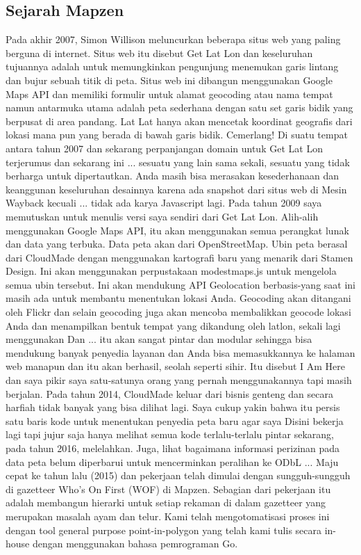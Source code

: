 \subsection{Sejarah Mapzen}
Pada akhir 2007, Simon Willison meluncurkan beberapa situs web yang paling berguna di internet. Situs web itu disebut Get Lat Lon dan keseluruhan tujuannya adalah untuk memungkinkan pengunjung menemukan garis lintang dan bujur sebuah titik di peta.
Situs web ini dibangun menggunakan Google Maps API dan memiliki formulir untuk alamat geocoding atau nama tempat namun antarmuka utama adalah peta sederhana dengan satu set garis bidik yang berpusat di area pandang. Lat Lat hanya akan mencetak koordinat geografis dari lokasi mana pun yang berada di bawah garis bidik. Cemerlang!
Di suatu tempat antara tahun 2007 dan sekarang perpanjangan domain untuk Get Lat Lon terjerumus dan sekarang ini ... sesuatu yang lain sama sekali, sesuatu yang tidak berharga untuk dipertautkan. Anda masih bisa merasakan kesederhanaan dan keanggunan keseluruhan desainnya karena ada snapshot dari situs web di Mesin Wayback kecuali ... tidak ada karya Javascript lagi.
Pada tahun 2009 saya memutuskan untuk menulis versi saya sendiri dari Get Lat Lon. Alih-alih menggunakan Google Maps API, itu akan menggunakan semua perangkat lunak dan data yang terbuka. Data peta akan dari OpenStreetMap. Ubin peta berasal dari CloudMade dengan menggunakan kartografi baru yang menarik dari Stamen Design. Ini akan menggunakan perpustakaan modestmaps.js untuk mengelola semua ubin tersebut. Ini akan mendukung API Geolocation berbasis-yang saat ini masih ada untuk membantu menentukan lokasi Anda. Geocoding akan ditangani oleh Flickr dan selain geocoding juga akan mencoba membalikkan geocode lokasi Anda dan menampilkan bentuk tempat yang dikandung oleh latlon, sekali lagi menggunakan 
Dan ... itu akan sangat pintar dan modular sehingga bisa mendukung banyak penyedia layanan dan Anda bisa memasukkannya ke halaman web manapun dan itu akan berhasil, seolah seperti sihir. Itu disebut I Am Here dan saya pikir saya satu-satunya orang yang pernah menggunakannya tapi masih berjalan. Pada tahun 2014, CloudMade keluar dari bisnis genteng dan secara harfiah tidak banyak yang bisa dilihat lagi.
Saya cukup yakin bahwa itu persis satu baris kode untuk menentukan penyedia peta baru agar saya Disini bekerja lagi tapi jujur saja hanya melihat semua kode terlalu-terlalu pintar sekarang, pada tahun 2016, melelahkan. Juga, lihat bagaimana informasi perizinan pada data peta belum diperbarui untuk mencerminkan peralihan ke ODbL ...
Maju cepat ke tahun lalu (2015) dan pekerjaan telah dimulai dengan sungguh-sungguh di gazetteer Who's On First (WOF) di Mapzen. Sebagian dari pekerjaan itu adalah membangun hierarki untuk setiap rekaman di dalam gazetteer yang merupakan masalah ayam dan telur. Kami telah mengotomatisasi proses ini dengan tool general purpose point-in-polygon yang telah kami tulis secara in-house dengan menggunakan bahasa pemrograman Go.

